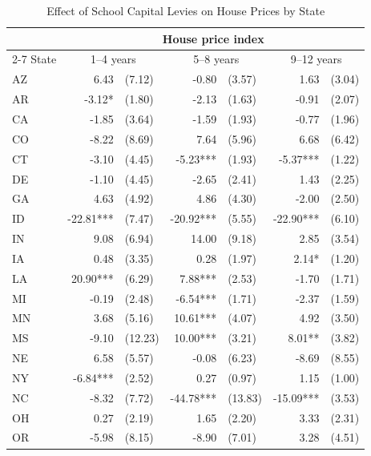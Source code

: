\begin{table}[htbp]
    \centering
    \caption{Effect of School Capital Levies on House Prices by State}
    \label{tab:state_house_prices}
    \begin{threeparttable}
    \begin{tabular}{l*{3}{r@{\hspace{3pt}}l}}
    \toprule
    & \multicolumn{6}{c}{House price index} \\
    \cmidrule(lr){2-7}
    State & \multicolumn{2}{c}{1--4 years} & \multicolumn{2}{c}{5--8 years} & \multicolumn{2}{c}{9--12 years} \\
    \midrule
    AZ & 6.43 & (7.12) & -0.80 & (3.57) & 1.63 & (3.04) \\
    AR & -3.12* & (1.80) & -2.13 & (1.63) & -0.91 & (2.07) \\
    CA & -1.85 & (3.64) & -1.59 & (1.93) & -0.77 & (1.96) \\
    CO & -8.22 & (8.69) & 7.64 & (5.96) & 6.68 & (6.42) \\
    CT & -3.10 & (4.45) & -5.23*** & (1.93) & -5.37*** & (1.22) \\
    DE & -1.10 & (4.45) & -2.65 & (2.41) & 1.43 & (2.25) \\
    GA & 4.63 & (4.92) & 4.86 & (4.30) & -2.00 & (2.50) \\
    ID & -22.81*** & (7.47) & -20.92*** & (5.55) & -22.90*** & (6.10) \\
    IN & 9.08 & (6.94) & 14.00 & (9.18) & 2.85 & (3.54) \\
    IA & 0.48 & (3.35) & 0.28 & (1.97) & 2.14* & (1.20) \\
    LA & 20.90*** & (6.29) & 7.88*** & (2.53) & -1.70 & (1.71) \\
    MI & -0.19 & (2.48) & -6.54*** & (1.71) & -2.37 & (1.59) \\
    MN & 3.68 & (5.16) & 10.61*** & (4.07) & 4.92 & (3.50) \\
    MS & -9.10 & (12.23) & 10.00*** & (3.21) & 8.01** & (3.82) \\
    NE & 6.58 & (5.57) & -0.08 & (6.23) & -8.69 & (8.55) \\
    NY & -6.84*** & (2.52) & 0.27 & (0.97) & 1.15 & (1.00) \\
    NC & -8.32 & (7.72) & -44.78*** & (13.83) & -15.09*** & (3.53) \\
    OH & 0.27 & (2.19) & 1.65 & (2.20) & 3.33 & (2.31) \\
    OR & -5.98 & (8.15) & -8.90 & (7.01) & 3.28 & (4.51) \\

\end{tabular}
\end{threeparttable}
\end{table}
